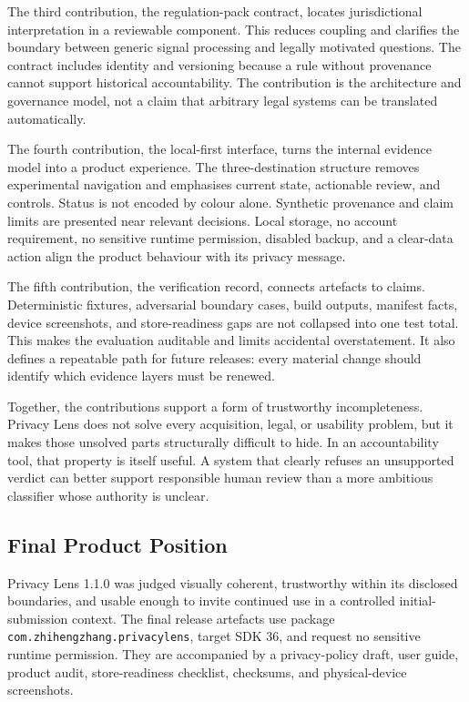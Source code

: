 The third contribution, the regulation-pack contract, locates jurisdictional interpretation in a reviewable component. This reduces coupling and clarifies the boundary between generic signal processing and legally motivated questions. The contract includes identity and versioning because a rule without provenance cannot support historical accountability. The contribution is the architecture and governance model, not a claim that arbitrary legal systems can be translated automatically.

The fourth contribution, the local-first interface, turns the internal evidence model into a product experience. The three-destination structure removes experimental navigation and emphasises current state, actionable review, and controls. Status is not encoded by colour alone. Synthetic provenance and claim limits are presented near relevant decisions. Local storage, no account requirement, no sensitive runtime permission, disabled backup, and a clear-data action align the product behaviour with its privacy message.

The fifth contribution, the verification record, connects artefacts to claims. Deterministic fixtures, adversarial boundary cases, build outputs, manifest facts, device screenshots, and store-readiness gaps are not collapsed into one test total. This makes the evaluation auditable and limits accidental overstatement. It also defines a repeatable path for future releases: every material change should identify which evidence layers must be renewed.

Together, the contributions support a form of trustworthy incompleteness. Privacy Lens does not solve every acquisition, legal, or usability problem, but it makes those unsolved parts structurally difficult to hide. In an accountability tool, that property is itself useful. A system that clearly refuses an unsupported verdict can better support responsible human review than a more ambitious classifier whose authority is unclear.

\subsection{Final Product Position}

Privacy Lens 1.1.0 was judged visually coherent, trustworthy within its disclosed boundaries, and usable enough to invite continued use in a controlled initial-submission context. The final release artefacts use package \texttt{com.zhihengzhang.privacylens}, target SDK 36, and request no sensitive runtime permission. They are accompanied by a privacy-policy draft, user guide, product audit, store-readiness checklist, checksums, and physical-device screenshots.

